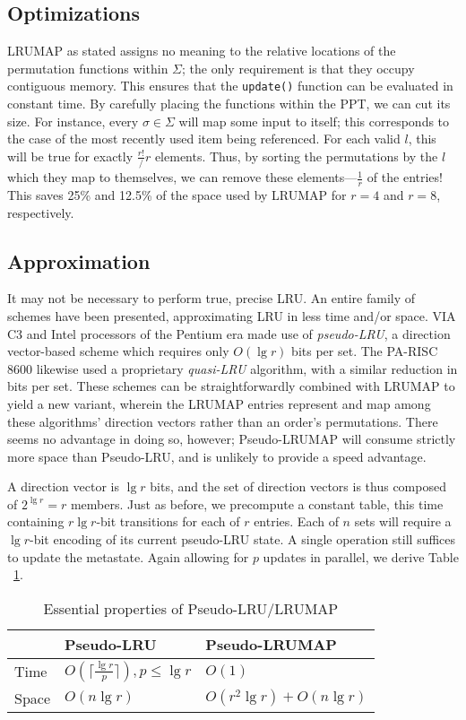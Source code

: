 \documentclass[10pt]{sigplanconf}
\begin{document}
\subsection{Optimizations}
LRUMAP as stated assigns no meaning to the relative locations of the permutation
functions within $\Sigma$; the only requirement is that they occupy contiguous
memory. This ensures that the \texttt{update()} function can be evaluated in
constant time. By carefully placing the functions within the PPT, we can cut its
size. For instance, every $\sigma\in\Sigma$ will map some input to itself; this
corresponds to the case of the most recently used item being referenced. For each
valid $l$, this will be true for exactly $\frac{r!}/r$ elements. Thus, by sorting
the permutations by the $l$ which they map to themselves, we can remove these
elements---$\frac{1}{r}$ of the entries! This saves 25\% and 12.5\% of the space
used by LRUMAP for $r=4$ and $r=8$, respectively.
\subsection{Approximation}
It may not be necessary to perform true, precise LRU. An entire family of
schemes have been presented, approximating LRU in less time and/or space.
VIA C3\textsuperscript{\textregistered} and Intel processors of the Pentium\textsuperscript{\textregistered} era\citep{shanley} made use of
\textit{pseudo-LRU}, a direction vector-based scheme which requires only
$O(\lg{r})$ bits per set\citep{handy}. The PA-RISC 8600\citep{hurd} likewise used
a proprietary \textit{quasi-LRU} algorithm, with a similar reduction in bits
per set. These schemes can be straightforwardly combined with LRUMAP to yield a
new variant, wherein the LRUMAP entries represent and map among these
algorithms' direction vectors rather than an order's permutations. There seems
no advantage in doing so, however; Pseudo-LRUMAP will consume strictly more space
than Pseudo-LRU, and is unlikely to provide a speed advantage.

A direction vector is $\lg{r}$ bits, and the set of direction vectors is thus
composed of $2^{\lg{r}}=r$ members. Just as before, we precompute a constant
table, this time containing $r \lg{r}$-bit transitions for each of $r$
entries. Each of $n$ sets will require a $\lg{r}$-bit encoding of its current
pseudo-LRU state. A single operation still suffices to update the metastate.
Again allowing for $p$ updates in parallel, we derive Table ~\ref{tab:plru}.

\begin{table}[h]
\begin{center}
	\begin{tabular}{|l|l|l|}
	\hline
	& Pseudo-LRU & Pseudo-LRUMAP \\
	\hline
	Time & $O(\lceil\frac{\lg{r}}{p}\rceil), {p}\le{\lg{r}}$ & $O(1)$ \\
	\hline
	Space & $O(n\lg{r})$ & $O(r^{2}\lg{r}) + O(n\lg{r})$ \\
	\hline
	\end{tabular}
	\caption{Essential properties of Pseudo-LRU/LRUMAP}
\label{tab:plru}
\end{center}
\end{table}
\end{document}
